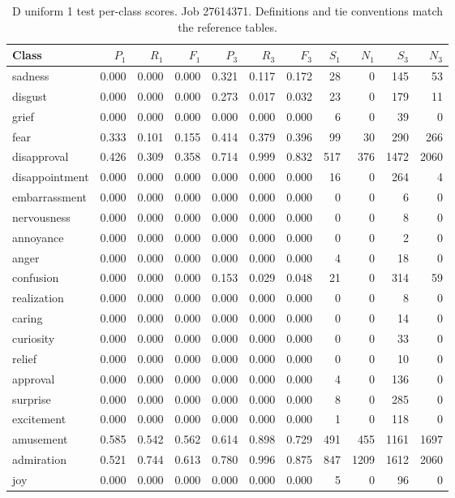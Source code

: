 \begin{table}[!htbp]
\centering
\scriptsize
\setlength{\tabcolsep}{5pt}
\begin{tabular}{lrrrrrrrrrr}
\toprule
Class & $P_1$ & $R_1$ & $F_1$ & $P_3$ & $R_3$ & $F_3$ & $S_1$ & $N_1$ & $S_3$ & $N_3$ \\
\midrule
sadness & 0.000 & 0.000 & 0.000 & 0.321 & 0.117 & 0.172 & 28 & 0 & 145 & 53 \\
disgust & 0.000 & 0.000 & 0.000 & 0.273 & 0.017 & 0.032 & 23 & 0 & 179 & 11 \\
grief & 0.000 & 0.000 & 0.000 & 0.000 & 0.000 & 0.000 & 6 & 0 & 39 & 0 \\
fear & 0.333 & 0.101 & 0.155 & 0.414 & 0.379 & 0.396 & 99 & 30 & 290 & 266 \\
disapproval & 0.426 & 0.309 & 0.358 & 0.714 & 0.999 & 0.832 & 517 & 376 & 1472 & 2060 \\
disappointment & 0.000 & 0.000 & 0.000 & 0.000 & 0.000 & 0.000 & 16 & 0 & 264 & 4 \\
embarrassment & 0.000 & 0.000 & 0.000 & 0.000 & 0.000 & 0.000 & 0 & 0 & 6 & 0 \\
nervousness & 0.000 & 0.000 & 0.000 & 0.000 & 0.000 & 0.000 & 0 & 0 & 8 & 0 \\
annoyance & 0.000 & 0.000 & 0.000 & 0.000 & 0.000 & 0.000 & 0 & 0 & 2 & 0 \\
anger & 0.000 & 0.000 & 0.000 & 0.000 & 0.000 & 0.000 & 4 & 0 & 18 & 0 \\
confusion & 0.000 & 0.000 & 0.000 & 0.153 & 0.029 & 0.048 & 21 & 0 & 314 & 59 \\
realization & 0.000 & 0.000 & 0.000 & 0.000 & 0.000 & 0.000 & 0 & 0 & 8 & 0 \\
caring & 0.000 & 0.000 & 0.000 & 0.000 & 0.000 & 0.000 & 0 & 0 & 14 & 0 \\
curiosity & 0.000 & 0.000 & 0.000 & 0.000 & 0.000 & 0.000 & 0 & 0 & 33 & 0 \\
relief & 0.000 & 0.000 & 0.000 & 0.000 & 0.000 & 0.000 & 0 & 0 & 10 & 0 \\
approval & 0.000 & 0.000 & 0.000 & 0.000 & 0.000 & 0.000 & 4 & 0 & 136 & 0 \\
surprise & 0.000 & 0.000 & 0.000 & 0.000 & 0.000 & 0.000 & 8 & 0 & 285 & 0 \\
excitement & 0.000 & 0.000 & 0.000 & 0.000 & 0.000 & 0.000 & 1 & 0 & 118 & 0 \\
amusement & 0.585 & 0.542 & 0.562 & 0.614 & 0.898 & 0.729 & 491 & 455 & 1161 & 1697 \\
admiration & 0.521 & 0.744 & 0.613 & 0.780 & 0.996 & 0.875 & 847 & 1209 & 1612 & 2060 \\
joy & 0.000 & 0.000 & 0.000 & 0.000 & 0.000 & 0.000 & 5 & 0 & 96 & 0 \\
\bottomrule
\end{tabular}
\caption{D uniform 1 test per-class scores. Job 27614371. Definitions and tie conventions match the reference tables.}
\label{tab:classes-d_uniform_k1}
\end{table}
